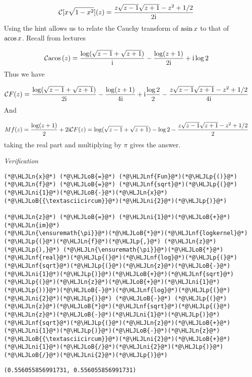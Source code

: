 \documentclass[12pt,a4paper]{article}
\newcommand{\HLJLn}[1]{#1}
\newcommand{\HLJLnf}[1]{\textcolor[RGB]{66,102,213}{#1}}
\newcommand{\HLJLni}[1]{\textcolor[RGB]{59,151,46}{#1}}
\newcommand{\HLJLoB}[1]{\textcolor[RGB]{102,102,102}{\textbf{#1}}}
\newcommand{\HLJLp}[1]{#1}
\def\I{ {\rm i} }
\def\CC{ {\cal C} }
\def\acos{ {\rm acos}\, }
\def\asin{ {\rm asin}\, }
\begin{document}
\[
\CC[x \sqrt{1-x^2}](z) = {z  \sqrt{z-1} \sqrt{z+1} - z^2 +1/2 \over 2 \I}
\]
Using the hint allows us to relate the Cauchy transform of $\asin x$ to that of $\acos x$. Recall from lectures

\[
\CC \acos(z) = {\log(\sqrt{z-1} + \sqrt{z+1}) \over \I} - {\log(z+1) \over 2 \I} + \I \log 2
\]
Thus we have

\[
\CC F(z) = {\log(\sqrt{z-1} + \sqrt{z+1}) \over 2\I} - {\log(z+1) \over 4 \I} + \I {\log 2 \over 2}
  - {z  \sqrt{z-1} \sqrt{z+1} - z^2 +1/2 \over 4 \I}
\]
And

\[
M f(z) = {\log(z+1) \over 2} + 2 \I \CC F(z) = \log(\sqrt{z-1} + \sqrt{z+1})- \log 2 - {z  \sqrt{z-1} \sqrt{z+1} - z^2 +1/2 \over 2}
\]
taking the real part and multiplying by \ensuremath{\pi} gives the answer.

\emph{Verification}


\begin{lstlisting}
(*@\HLJLn{x}@*) (*@\HLJLoB{=}@*) (*@\HLJLnf{Fun}@*)(*@\HLJLp{()}@*)
(*@\HLJLn{f}@*) (*@\HLJLoB{=}@*) (*@\HLJLnf{sqrt}@*)(*@\HLJLp{(}@*)(*@\HLJLni{1}@*)(*@\HLJLoB{-}@*)(*@\HLJLn{x}@*)(*@\HLJLoB{{\textasciicircum}}@*)(*@\HLJLni{2}@*)(*@\HLJLp{)}@*)

(*@\HLJLn{z}@*) (*@\HLJLoB{=}@*) (*@\HLJLni{1}@*)(*@\HLJLoB{+}@*)(*@\HLJLn{im}@*)
(*@\HLJLn{\ensuremath{\pi}}@*)(*@\HLJLoB{*}@*)(*@\HLJLnf{logkernel}@*)(*@\HLJLp{(}@*)(*@\HLJLn{f}@*)(*@\HLJLp{,}@*) (*@\HLJLn{z}@*)(*@\HLJLp{),}@*) (*@\HLJLn{\ensuremath{\pi}}@*)(*@\HLJLoB{*}@*)(*@\HLJLnf{real}@*)(*@\HLJLp{(}@*)(*@\HLJLnf{log}@*)(*@\HLJLp{(}@*)(*@\HLJLnf{sqrt}@*)(*@\HLJLp{(}@*)(*@\HLJLn{z}@*)(*@\HLJLoB{-}@*)(*@\HLJLni{1}@*)(*@\HLJLp{)}@*)(*@\HLJLoB{+}@*)(*@\HLJLnf{sqrt}@*)(*@\HLJLp{(}@*)(*@\HLJLn{z}@*)(*@\HLJLoB{+}@*)(*@\HLJLni{1}@*)(*@\HLJLp{))}@*)(*@\HLJLoB{-}@*)(*@\HLJLnf{log}@*)(*@\HLJLp{(}@*)(*@\HLJLni{2}@*)(*@\HLJLp{)}@*) (*@\HLJLoB{-}@*) (*@\HLJLp{(}@*)(*@\HLJLn{z}@*)(*@\HLJLoB{*}@*)(*@\HLJLnf{sqrt}@*)(*@\HLJLp{(}@*)(*@\HLJLn{z}@*)(*@\HLJLoB{-}@*)(*@\HLJLni{1}@*)(*@\HLJLp{)}@*)(*@\HLJLnf{sqrt}@*)(*@\HLJLp{(}@*)(*@\HLJLn{z}@*)(*@\HLJLoB{+}@*)(*@\HLJLni{1}@*)(*@\HLJLp{)}@*)(*@\HLJLoB{-}@*)(*@\HLJLn{z}@*)(*@\HLJLoB{{\textasciicircum}}@*)(*@\HLJLni{2}@*)(*@\HLJLoB{+}@*)(*@\HLJLni{1}@*)(*@\HLJLoB{/}@*)(*@\HLJLni{2}@*)(*@\HLJLp{)}@*)(*@\HLJLoB{/}@*)(*@\HLJLni{2}@*)(*@\HLJLp{)}@*)
\end{lstlisting}

\begin{lstlisting}
(0.556055856991731, 0.556055856991731)
\end{lstlisting}
\end{document}
